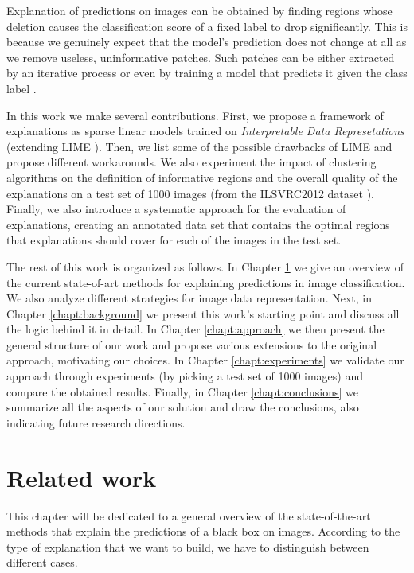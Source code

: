 \documentclass[12pt, twoside, a4paper]{report}
\newcommand{\whitepage}{\clearpage
						\thispagestyle{empty}
						\phantom{a}
						\vfill}
\begin{document}
Explanation of predictions on images can be obtained by finding regions whose deletion causes the classification score of a fixed label to drop significantly. This is because we genuinely expect that the model's prediction does not change at all as we remove useless, uninformative patches. 
Such patches can be either extracted by an iterative process or even by training a model that predicts it given the class label \cite{real_time_image_saliency}. 

\bigskip

In this work we make several contributions. First, we propose a framework of explanations as sparse linear models trained on \textit{Interpretable Data Represetations} (extending LIME \cite{lime}). Then, we list some of the possible drawbacks of LIME and propose different workarounds. We also experiment the impact of clustering algorithms on the definition of informative regions and the overall quality of the explanations on a test set of 1000 images (from the ILSVRC2012 dataset \cite{ilsvrc}). 
Finally, we also introduce a systematic approach for the evaluation of explanations, creating an annotated data set that contains the optimal regions that explanations should cover for each of the images in the test set.

The rest of this work is organized as follows. In Chapter \ref{chapt:related-work} we give an overview of the current state-of-art methods for explaining predictions in image classification. We also analyze different strategies for image data representation. Next, in Chapter \ref{chapt:background} we present this work's starting point and discuss all the logic behind it in detail. In Chapter \ref{chapt:approach} we then present the general structure of our work and propose various extensions to the original approach, motivating our choices. In Chapter \ref{chapt:experiments} we validate our approach through experiments (by picking a test set of 1000 images) and compare the obtained results. Finally, in Chapter \ref{chapt:conclusions} we summarize all the aspects of our solution and draw the conclusions, also indicating future research directions.

\whitepage


\chapter{Related work}\label{chapt:related-work}

This chapter will be dedicated to a general overview of the state-of-the-art methods that explain the predictions of a black box on images. According to the type of explanation that we want to build, we have to distinguish between different cases. 
\end{document}
